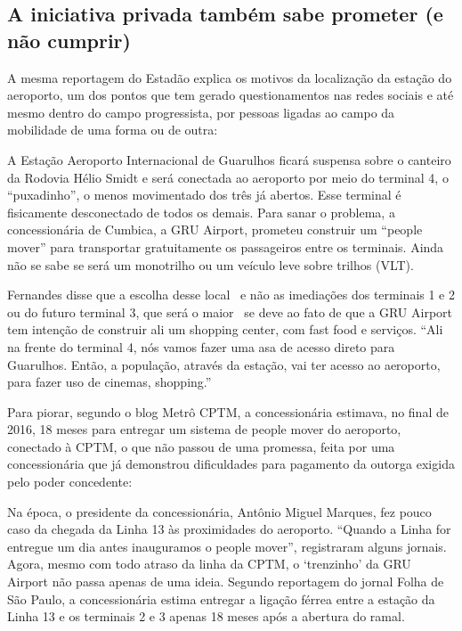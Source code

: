 \documentclass[11pt,fleqn]{book} %
\begin{document}
\subsection{A iniciativa privada também sabe prometer (e não cumprir)}

A mesma reportagem do Estadão explica os motivos da localização da estação do aeroporto, um dos pontos que tem gerado questionamentos nas redes sociais e até mesmo dentro do campo progressista, por pessoas ligadas ao campo da mobilidade de uma forma ou de outra:

\begin{citacao}
	A Estação Aeroporto Internacional de Guarulhos ficará suspensa sobre o canteiro da Rodovia Hélio Smidt e será conectada ao aeroporto por meio do terminal 4, o “puxadinho”, o menos movimentado dos três já abertos. Esse terminal é fisicamente desconectado de todos os demais. Para sanar o problema, a concessionária de Cumbica, a GRU Airport, prometeu construir um “people mover” para transportar gratuitamente os passageiros entre os terminais. Ainda não se sabe se será um monotrilho ou um veículo leve sobre trilhos (VLT).
	
	Fernandes disse que a escolha desse local \textemdash\ e não as imediações dos terminais 1 e 2 ou do futuro terminal 3, que será o maior \textemdash\ se deve ao fato de que a GRU Airport tem intenção de construir ali um shopping center, com fast food e serviços. “Ali na frente do terminal 4, nós vamos fazer uma asa de acesso direto para Guarulhos. Então, a população, através da estação, vai ter acesso ao aeroporto, para fazer uso de cinemas, shopping.”
\end{citacao}

Para piorar, segundo o blog Metrô CPTM, a concessionária estimava, no final de 2016, 18 meses para entregar um sistema de people mover do aeroporto, conectado à CPTM, o que não passou de uma promessa, feita por uma concessionária que já demonstrou dificuldades para pagamento da outorga exigida pelo poder concedente:

\begin{citacao}
	Na época, o presidente da concessionária, Antônio Miguel Marques, fez pouco caso da chegada da Linha 13 às proximidades do aeroporto. “Quando a Linha for entregue um dia antes inauguramos o people mover”, registraram alguns jornais. Agora, mesmo com todo atraso da linha da CPTM, o ‘trenzinho’ da GRU Airport não passa apenas de uma ideia. Segundo reportagem do jornal Folha de São Paulo, a concessionária estima entregar a ligação férrea entre a estação da Linha 13 e os terminais 2 e 3 apenas 18 meses após a abertura do ramal.
\end{citacao}
\end{document}
